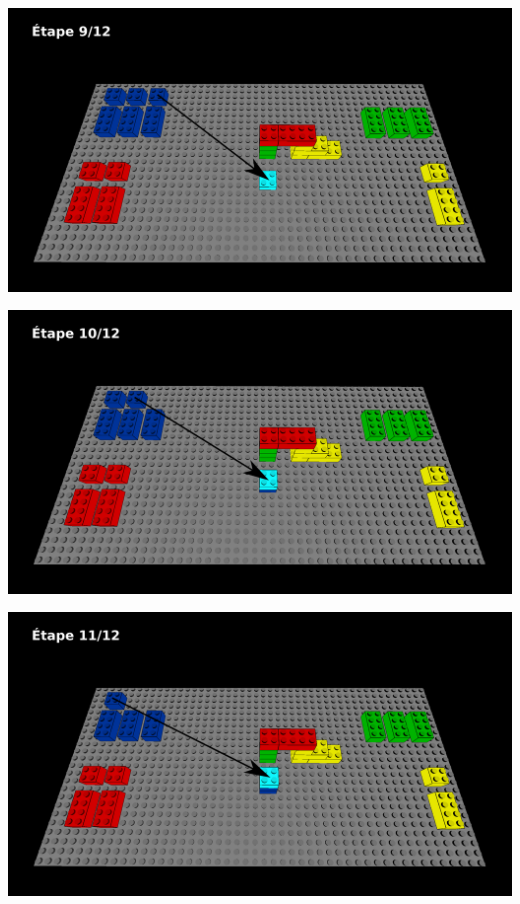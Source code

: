 \documentclass[aspectratio=169]{beamer}
\begin{document}
\begin{frame}
  \includegraphics[width=\linewidth]{step9.png}
\end{frame}

\begin{frame}
  \includegraphics[width=\linewidth]{step10.png}
\end{frame}

\begin{frame}
  \includegraphics[width=\linewidth]{step11.png}
\end{frame}
\end{document}
